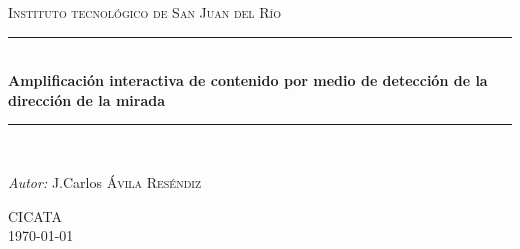 \documentclass[12pt]{article} %
\begin{document}

\begin{titlepage}

\newcommand{\HRule}{\rule{\linewidth}{0.5mm}} %

\center %

\textsc{\LARGE Instituto tecnológico de San Juan del Río}\\[1.5cm] %


\HRule \\[0.4cm]
{ \huge \bfseries Amplificación interactiva de contenido por medio de detección de la dirección de la mirada}\\[0.4cm] %
\HRule \\[1.5cm]

\begin{minipage}{0.8\textwidth}
\begin{flushleft} \large
\emph{Autor:}
J.Carlos \textsc{Ávila Reséndiz}\\ %

\end{flushleft}
\end{minipage}

\vspace{3cm}
\textsc{CICATA}\\[1.5cm] %

{\large \today}\\[3cm] %


\vfill %

\end{titlepage}


\tableofcontents %

\newpage %
\end{document}
